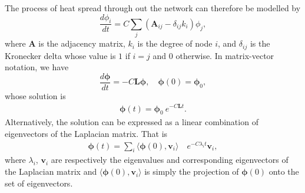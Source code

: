 \documentclass[10pt,a4paper]{article}
\begin{document}
    	The process of heat spread through out the network can therefore be modelled by
    	\begin{equation}
    	\frac{d\phi_i}{dt} = C \sum_j (\mathbf{A}_{ij} - \delta_{ij} k_i) \phi_j,
    	\label{difusion}
    	\end{equation}
    	where $\mathbf{A}$ is the adjacency matrix, $k_i$ is the degree of node $i$, and $\delta_{ij}$ is the Kronecker delta whose value is $1$ if $i=j$ and $0$ otherwise. In matrix-vector notation, we have
    	\begin{equation}
    	\frac{d\boldsymbol{\phi}}{dt} = -C\mathbf{L}\boldsymbol{\phi}, \quad \boldsymbol{\phi}(0) = \boldsymbol{\phi}_0 ,
    	\label{dif-final-eqn}
    	\end{equation}
    	whose solution is 
    	\begin{eqnarray}
    	\boldsymbol{\phi}(t) = \boldsymbol{\phi}_0~e^{-C\mathbf{L}t}.
    	\end{eqnarray}
    	Alternatively, the solution can be expressed as a linear combination of eigenvectors of the Laplacian matrix. That is
    	 \begin{eqnarray*}
    	 	\boldsymbol{\phi}(t) = \sum_i \langle \boldsymbol{\phi}(0),\mathbf{v}_i \rangle \quad e^{-C\lambda_i t} \mathbf{v}_i,  
    	 \end{eqnarray*}
    	 where $\lambda_i$, $\mathbf{v}_i$ are respectively the eigenvalues and corresponding eigenvectors of the Laplacian matrix and $\langle \boldsymbol{\phi}(0),\mathbf{v}_i \rangle$ is simply the projection of $\boldsymbol{\phi}(0)$ onto the set of eigenvectors.
    	 
\end{document}
